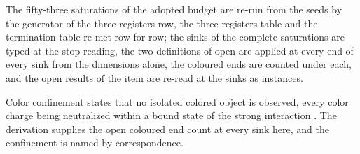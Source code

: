 The fifty-three saturations of the adopted budget are re-run from the seeds by the generator of the three-registers row, the three-registers table and the termination table re-met row for row; the sinks of the complete saturations are typed at the stop reading, the two definitions of open are applied at every end of every sink from the dimensions alone, the coloured ends are counted under each, and the open results of the item are re-read at the sinks as instances.

\begin{chbridge}
Color confinement states that no isolated colored object is observed, every color charge being neutralized within a bound state of the strong interaction \cite{Wilson1974,Gross1973}. The derivation supplies the open coloured end count at every sink here, and the confinement is named by correspondence.
\end{chbridge}
